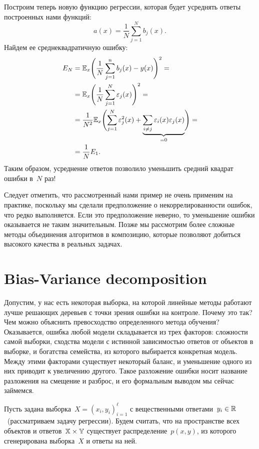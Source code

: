 \documentclass[12pt,fleqn]{article}
\begin{document}
Построим теперь новую функцию регрессии,
которая будет усреднять ответы построенных нами функций:
\[
    a(x) = \frac{1}{N} \sum_{j = 1}^{N} b_j(x).
\]
Найдем ее среднеквадратичную ошибку:
\begin{align*}
    E_N
    &=
    \mathbb{E}_x \Biggl(
        \frac{1}{N} \sum_{j = 1}^{n} b_j(x)
        -
        y(x)
    \Biggr)^2
    =\\
    &=
    \mathbb{E}_x \Biggl(
        \frac{1}{N} \sum_{j = 1}^{N} \varepsilon_j(x)
    \Biggr)^2
    =\\
    &=
    \frac{1}{N^2}
    \mathbb{E}_x \Biggl(
        \sum_{j = 1}^{N} \varepsilon_j^2(x)
        +
        \underbrace{\sum_{i \neq j} \varepsilon_i(x) \varepsilon_j(x)}_{=0}
    \Biggr)
    =\\
    &=
    \frac{1}{N} E_1.
\end{align*}
Таким образом, усреднение ответов позволило уменьшить средний квадрат ошибки в~$N$ раз!

Следует отметить, что рассмотренный нами пример не очень применим на практике,
поскольку мы сделали предположение о некоррелированности ошибок, что редко выполняется.
Если это предположение неверно, то уменьшение ошибки оказывается не таким значительным.
Позже мы рассмотрим более сложные методы объединения алгоритмов в композицию,
которые позволяют добиться высокого качества в реальных задачах.

\section{Bias-Variance decomposition}
Допустим, у нас есть некоторая выборка, на которой линейные методы
работают лучше решающих деревьев с точки зрения ошибки
на контроле.
Почему это так? Чем можно объяснить превосходство определенного метода обучения?
Оказывается, ошибка любой модели складывается из трех факторов:
сложности самой выборки, сходства модели с истинной зависимостью ответов от объектов
в выборке, и богатства семейства, из которого выбирается конкретная модель.
Между этими факторами существует некоторый баланс, и уменьшение одного
из них приводит к увеличению другого.
Такое разложение ошибки носит название разложения на смещение и разброс,
и его формальным выводом мы сейчас займемся.

Пусть задана выборка~$X = (x_i, y_i)_{i = 1}^{\ell}$
с вещественными ответами~$y_i \in \mathbb{R}$~(рассматриваем задачу регрессии).
Будем считать, что на пространстве всех объектов и ответов~$\XX \times \YY$ существует
распределение~$p(x, y)$, из которого сгенерирована выборка~$X$ и ответы на ней.
\end{document}
